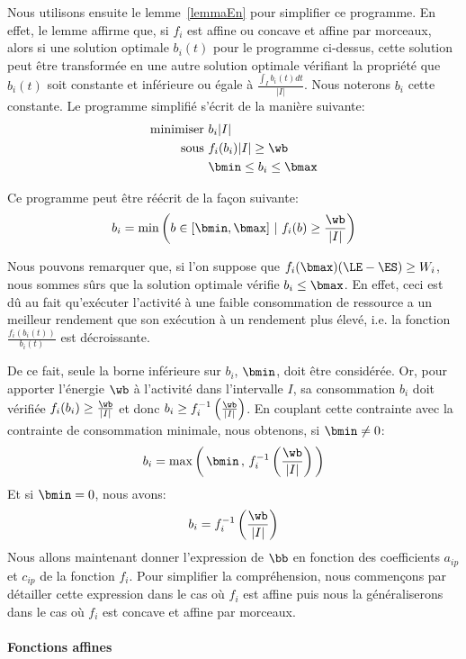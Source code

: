 Nous utilisons ensuite le lemme~\ref{lemmaEn} pour simplifier ce
programme. En effet, le lemme affirme que, si $f_i$ est affine ou
concave et affine par morceaux, alors si une solution optimale
$b_i(t)$ pour le programme ci-dessus, cette solution peut être
transformée en une autre solution optimale vérifiant la propriété que
$b_i(t)$ soit constante et inférieure ou égale à
$\frac{\int_{I}b_i(t)dt}{|I|}$. Nous noterons $b_i$ cette
constante. Le programme simplifié s'écrit de la manière suivante:
\begin{align}
  \text{minimiser }   & b_i|I| \label{eq:convSimp_obj} \\
  \text{sous } & f_i(b_i)|I| \ge \wb \label{eq:convSimp_nrj}\\
                     &\bmin \le  b_i \le \bmax \label{eq:convSimp_nrj}
\end{align}


Ce programme peut être réécrit de la façon suivante: 
\[ b_i=\min\left( b \in [\bmin,\bmax]\ |\ f_i(b) \ge
    \frac{\wb}{|I|}\right)
\]

Nous pouvons remarquer que, si l'on suppose que $f_i(\bmax) (\LE - \ES
) \ge W_i$, nous sommes sûrs que la solution optimale vérifie $b_i \le
\bmax$. En effet, ceci est dû au fait qu'exécuter l'activité à une
faible consommation de ressource a un meilleur rendement que son
exécution à un rendement plus élevé, i.e. la fonction
$\frac{f_i(b_i(t))}{b_i(t)}$ est décroissante. 

De ce fait, seule la borne inférieure sur $b_i$, $\bmin$, doit être
considérée. Or, pour apporter l'énergie $\wb$ à l'activité dans
l'intervalle $I$, sa consommation $b_i$ doit vérifiée $f_i(b_i) \ge
\frac{\wb}{|I|}$ et donc $b_i \ge
f_i^{-1}\left(\frac{\wb}{|I|}\right)$. En couplant cette contrainte
avec la contrainte de consommation minimale, nous obtenons, si $\bmin
\neq 0$:
\[
 b_i= \max\left(\, \bmin \, ,\, 
    f_i^{-1}\left(\frac{\wb}{|I|}\right)\, \right)
\]
Et si $\bmin = 0$, nous avons:
\[
 b_i=  f_i^{-1}\left(\frac{\wb}{|I|}\right)
\]
Nous allons maintenant donner l'expression de $\bb$  en fonction des
coefficients $a_{ip}$  et $c_{ip}$ de la fonction $f_i$. Pour
simplifier la compréhension, nous commençons par détailler cette
expression dans le cas où $f_i$ est affine puis nous la généraliserons
dans le cas où $f_i$ est concave et affine par morceaux. 

\paragraph{Fonctions affines}

